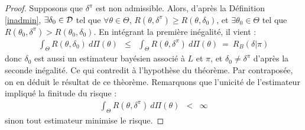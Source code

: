  
 \begin{proof}%
 
Supposons que $\delta^{\pi}$ est non admissible. Alors, d'après la Définition \ref{inadmin}, $\exists \delta_0\in{\cal{D}}$ tel que $\forall \theta\in\Theta$, $R(\theta,\delta^{\pi})\geq R(\theta,\delta_0)$, et  $\exists \theta_0\in\Theta$ tel que $R(\theta_0,\delta^{\pi})>R(\theta_0,\delta_0)$. En intégrant la première inégalité, il vient :
\begin{eqnarray*}
\int_{\Theta} R(\theta,\delta_0) \ d\Pi(\theta) & \leq & \int_{\Theta} R(\theta,\delta^{\pi}) \ d\Pi(\theta) \ = \ R_B(\delta|\pi)
\end{eqnarray*}
donc $\delta_0$ est aussi un estimateur bayésien associé à $L$ et $\pi$, et $\delta_0\neq \delta^{\pi}$ d'après la seconde inégalité. Ce qui contredit à l'hypothèse du théorème. Par contraposée, on en déduit le résultat de ce thèorème. Remarquons que l'unicité de l'estimateur impliqué la finitude du risque :
\begin{eqnarray*}
\int_{\Theta} R(\theta,\delta^{\pi}) \ d\Pi(\theta) & < & \infty
\end{eqnarray*}
sinon tout estimateur minimise le risque.
\end{proof}
